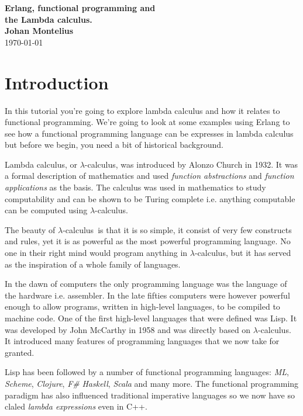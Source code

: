 \documentclass[a4paper,11pt]{article}
\newcommand{\nnsection}[1]{
\section*{#1}
\addcontentsline{toc}{section}{#1}
}
\begin{document}
\begin{center}
\vspace{20pt}
\textbf{\large Erlang, functional programming and\\ the Lambda calculus.}\\
\vspace{10pt}
\textbf{Johan Montelius}\\
\vspace{10pt}
\today{}
\end{center}

\newcommand{\lamc}[0]{$\lambda$-calculus}
\newcommand{\lama}[0]{$\lambda$-abstraction}
\newcommand{\lame}[0]{$\lambda$-expression}
\newcommand{\alphac}[0]{$\alpha$-conversion}
\newcommand{\betar}[0]{$\beta$-reduction}
\newcommand{\etac}[0]{$\eta$-conversion}

\nnsection{Introduction}

In this tutorial you're going to explore lambda calculus and how it
relates to functional programming. We're going to look at some
examples using Erlang to see how a functional programming language can
be expresses in lambda calculus but before we begin, you need a bit of
historical background.

Lambda calculus, or \lamc, was introduced by Alonzo Church in 1932. It
was a formal description of mathematics and used {\em function abstractions}
and {\em function applications} as the basis. The calculus was used in
mathematics to study computability and can be shown to be Turing
complete i.e. anything computable can be computed using \lamc.


The beauty of \lamc\ is that it is so simple, it consist of very few
constructs and rules, yet it is as powerful as the most powerful
programming language. No one in their right mind would program
anything in \lamc, but it has served as the inspiration of a whole
family of languages.

In the dawn of computers the only programming language was the language of
the hardware i.e. assembler. In the late fifties computers were
however powerful enough to allow programs, written in high-level
languages, to be compiled to machine code. One of the first high-level
languages that were defined was Lisp. It was developed by John
McCarthy in 1958 and was directly based on \lamc. It introduced many
features of programming languages that we now take for granted.

Lisp has been followed by a number of functional
programming languages: {\em ML}, {\em Scheme}, {\em Clojure}, {\em
  F\#} {\em Haskell}, {\em Scala} and many more. The functional
programming paradigm has also influenced traditional imperative
languages so we now have so claled {\em lambda expressions} even in C++.
\end{document}
